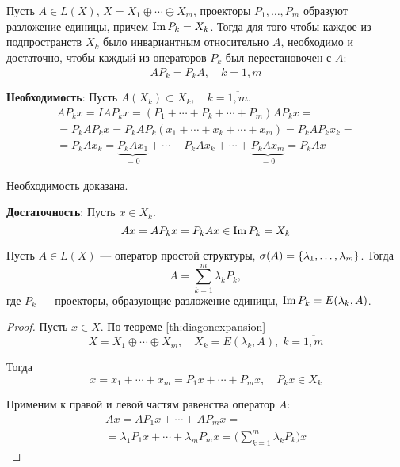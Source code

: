 \begin{theorem}
    Пусть $A\in L(X)$, $X = X_1 \oplus \dotsb \oplus X_m$, проекторы $P_1,
    \dotsc, P_m$ образуют разложение единицы, причем $\operatorname{Im} P_k = X_k$. 
    Тогда для того чтобы каждое из подпространств $X_k$ было инвариантным
    относительно $A$, необходимо и достаточно, чтобы каждый из операторов $P_k$
    был перестановочен с $A$:
    \[ AP_k = P_kA, \quad k = \overline{1,m} \]
\end{theorem}

\begin{proofbreak}
    \dindent \textbf{Необходимость}:
    Пусть $A(X_k) \subset X_k, \quad k = \overline{1,m}$.
    \begin{multline*}
        AP_kx = I A P_k x = (P_1 + \dotsb + P_k + \dotsb + P_m) A P_k x
        = \\ = P_k A P_k x = P_k A P_k (x_1 + \dotsb + x_k + \dotsb + x_m) = P_k A
        P_k x_k =\\= P_k A x_k = \underbrace{P_k A x_1}_{= 0} + \dotsb + P_k A
        x_k + \dotsb + \underbrace{P_k A x_m}_{= 0} = P_k A x
    \end{multline*}

    Необходимость доказана.

    \textbf{Достаточность}:
    Пусть $x \in X_k$.
    \[ Ax = AP_k x = P_k A x \in \operatorname{Im} P_k = X_k \]
\end{proofbreak}

\begin{theorem}\label{th:spectraldecomposition}
    Пусть $A\in L(X)$ — оператор простой структуры, $\operatorname{\sigma}(A) = \left\{\lambda_1,
    \dotsc, \lambda_m\right\}$. Тогда 
    \begin{equation}\label{eq:spectraldecomposition}
        A = \sum_{k=1}^m \lambda_k P_k,
    \end{equation}
    где $P_k$ — проекторы, образующие разложение единицы, $\operatorname{Im} P_k = E(\lambda_k, A)$.
\end{theorem}

\begin{proof}
    Пусть $x \in X$. По теореме \ref{th:diagonexpansion}
    \[ X = X_1 \oplus \dotsb \oplus X_m, \quad X_k = E(\lambda_k, A),\; k =
    \overline{1,m} \]

    Тогда
    \[ x = x_1 + \dotsb + x_m = P_1 x + \dotsb + P_m x, \quad P_k x \in X_k \]

    Применим к правой и левой частям равенства оператор $A$:
    \begin{multline*}
        Ax = AP_1 x + \dotsb + AP_m x = \\ = \lambda_1 P_1 x + \dotsb + \lambda_m
        P_m x =  \bigg( \sum_{k=1}^m \lambda_k P_k \bigg) x
    \end{multline*}
\end{proof}

